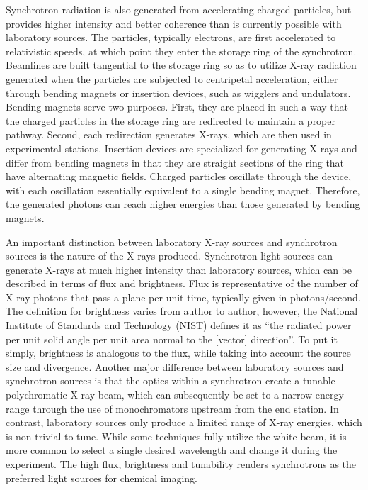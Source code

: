 \documentclass[journal=cmatex,manuscript=perspective]{achemso}
\begin{document}
Synchrotron radiation is also generated from accelerating charged
particles, but provides higher intensity and better coherence than is
currently possible with laboratory sources. The particles,
typically electrons, are first accelerated to relativistic speeds, at
which point they enter the storage ring of the synchrotron. Beamlines
are built tangential to the storage ring so as to utilize X-ray
radiation generated when the particles are subjected to centripetal
acceleration, either through bending magnets or insertion devices,
such as wigglers and undulators. Bending magnets serve two
purposes. First, they are placed in such a way that the charged
particles in the storage ring are redirected to maintain a proper
pathway. Second, each redirection generates X-rays, which are then
used in experimental stations. Insertion devices are
specialized for generating X-rays and differ from bending magnets in
that they are straight sections of the ring that have alternating
magnetic fields. Charged particles oscillate through the device, with
each oscillation essentially equivalent to a single bending
magnet. Therefore, the generated photons can reach higher energies
than those generated by bending magnets\cite{synchrotronradiation}.

An important distinction between laboratory X-ray sources and
synchrotron sources is the nature of the X-rays produced. Synchrotron
light sources can generate X-rays at much higher intensity than
laboratory sources, which can be described in terms of flux and
brightness. Flux is representative of the number of X-ray photons that
pass a plane per unit time, typically given in photons/second. The
definition for brightness varies from author to author, however, the
National Institute of Standards and Technology (NIST) defines it as
``the radiated power per unit solid angle per unit area normal to the
[vector] direction''\cite{sesame2004}. To put it simply, brightness is
analogous to the flux, while taking into account the source size and
divergence. Another major difference between laboratory sources and
synchrotron sources is that the optics within a synchrotron create a
tunable polychromatic X-ray beam, which can subsequently be set to a
narrow energy range through the use of monochromators upstream from
the end station. In contrast, laboratory sources only produce a
limited range of X-ray energies, which is non-trivial to tune. While
some techniques fully utilize the white beam\cite{ice2009}, it is more
common to select a single desired wavelength and change it during the
experiment. The high flux, brightness and tunability renders synchrotrons as the preferred
light sources for chemical imaging.
\end{document}
